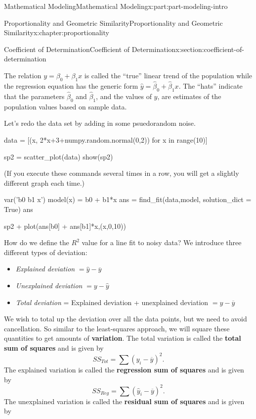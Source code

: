 \documentclass[oneside,10pt,]{book}
\newcommand{\terminology}[1]{\textbf{#1}}
\numberwithin{equation}{section}
\begin{document}
\begin{partptx}{Mathematical Modeling}{}{Mathematical Modeling}{}{}{x:part:part-modeling-intro}
\begin{chapterptx}{Proportionality and Geometric Similarity}{}{Proportionality and Geometric Similarity}{}{}{x:chapter:proportionality}
\begin{sectionptx}{Coefficient of Determination}{}{Coefficient of Determination}{}{}{x:section:coefficient-of-determination}
\par
The relation \(y = \beta_0 + \beta_1x\) is called the ``true'' linear trend of the population while the regression equation has the generic form \(\hat{y} = \hat{\beta}_0 + 
\hat{\beta}_1 x\).  The ``hats'' indicate that the parameters \(\hat{\beta}_0\) and \(\hat{\beta}_1\), and the values of \(y\), are estimates of the population values based on sample data.%
\par
Let's redo the data set by adding in some psuedorandom noise.%
\begin{sageinput}
data = [(x, 2*x+3+numpy.random.normal(0,2)) for x in range(10)]

sp2 = scatter_plot(data)
show(sp2)
\end{sageinput}
(If you execute these commands several times in a row, you will get a slightly different graph each time.)%
\begin{sageinput}
var('b0 b1 x')
model(x) = b0 + b1*x
ans = find_fit(data,model, solution_dict = True)
ans
\end{sageinput}
\begin{sageinput}
sp2 + plot(ans[b0] + ans[b1]*x,(x,0,10))
\end{sageinput}
How do we define the \(R^2\) value for a line fit to noisy data?  We introduce three different types of deviation:%
%
\begin{itemize}[label=\textbullet]
\item{}\emph{Explained deviation} \({}=\hat{y} - \overline{y}\)%
\item{}\emph{Unexplained deviation} \({}=y - \hat{y}\)%
\item{}\emph{Total deviation} = Explained deviation + unexplained deviation \({}= y - \overline{y}\)%
\end{itemize}
We wish to total up the deviation over all the data points, but we need to avoid cancellation. So similar to the least-squares approach, we will square these quantities to get amounts of \terminology{variation}.  The total variation is called the \terminology{total sum of squares} and is given by%
%
\begin{equation*}
SS_{Tot} = \sum (y_i - \overline{y})^2.
\end{equation*}
The explained variation is called the \terminology{regression sum of squares} and is given by%
%
\begin{equation*}
SS_{Reg} = \sum (\hat{y}_i - \overline{y})^2.
\end{equation*}
The unexplained variation is called the \terminology{residual sum of squares} and is given by%

\end{sectionptx}
\end{chapterptx}
\end{partptx}
\end{document}
